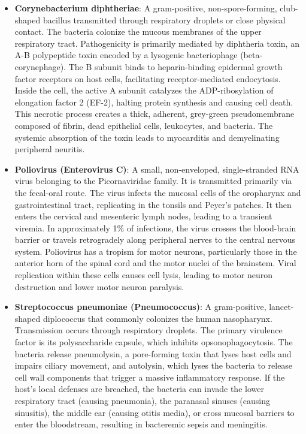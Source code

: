 \begin{itemize}
    \item \textbf{Corynebacterium diphtheriae}: A gram-positive, non-spore-forming, club-shaped bacillus transmitted through respiratory droplets or close physical contact. The bacteria colonize the mucous membranes of the upper respiratory tract. Pathogenicity is primarily mediated by diphtheria toxin, an A-B polypeptide toxin encoded by a lysogenic bacteriophage (beta-corynephage). The B subunit binds to heparin-binding epidermal growth factor receptors on host cells, facilitating receptor-mediated endocytosis. Inside the cell, the active A subunit catalyzes the ADP-ribosylation of elongation factor 2 (EF-2), halting protein synthesis and causing cell death. This necrotic process creates a thick, adherent, grey-green pseudomembrane composed of fibrin, dead epithelial cells, leukocytes, and bacteria. The systemic absorption of the toxin leads to myocarditis and demyelinating peripheral neuritis.
    \item \textbf{Poliovirus (Enterovirus C)}: A small, non-enveloped, single-stranded RNA virus belonging to the Picornaviridae family. It is transmitted primarily via the fecal-oral route. The virus infects the mucosal cells of the oropharynx and gastrointestinal tract, replicating in the tonsils and Peyer's patches. It then enters the cervical and mesenteric lymph nodes, leading to a transient viremia. In approximately 1\% of infections, the virus crosses the blood-brain barrier or travels retrogradely along peripheral nerves to the central nervous system. Poliovirus has a tropism for motor neurons, particularly those in the anterior horn of the spinal cord and the motor nuclei of the brainstem. Viral replication within these cells causes cell lysis, leading to motor neuron destruction and lower motor neuron paralysis.
    \item \textbf{Streptococcus pneumoniae (Pneumococcus)}: A gram-positive, lancet-shaped diplococcus that commonly colonizes the human nasopharynx. Transmission occurs through respiratory droplets. The primary virulence factor is its polysaccharide capsule, which inhibits opsonophagocytosis. The bacteria release pneumolysin, a pore-forming toxin that lyses host cells and impairs ciliary movement, and autolysin, which lyses the bacteria to release cell wall components that trigger a massive inflammatory response. If the host's local defenses are breached, the bacteria can invade the lower respiratory tract (causing pneumonia), the paranasal sinuses (causing sinusitis), the middle ear (causing otitis media), or cross mucosal barriers to enter the bloodstream, resulting in bacteremic sepsis and meningitis.
\end{itemize}


